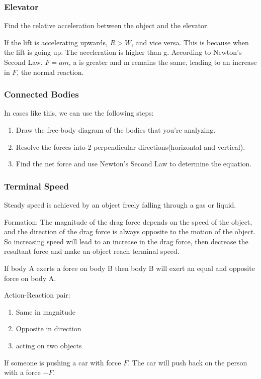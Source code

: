 \documentclass[11pt, a4paper,oneside]{book}
\begin{document}
\subsubsection{Elevator}
Find the relative acceleration between the object and the elevator. \par
If the lift is accelerating upwards, $R > W$, and vice versa. This is because when the lift is going up. The acceleration is higher than g. According to Newton's Second Law, $F = am$, a is greater and m remains the same, leading to an increase in $F$, the normal reaction.
\subsubsection{Connected Bodies}

In cases like this, we can use the following steps:
\begin{enumerate}
    \setlength{\itemsep}{-1ex}
    \setlength{\parsep}{-1ex}
    \item Draw the free-body diagram of the bodies that you're analyzing.
    \item Resolve the forces into 2 perpendicular directions(horizontal and vertical).
    \item Find the net force and use Newton's Second Law to determine the equation.
    \setlength{\topsep}{-1em}
\end{enumerate}
\subsubsection{Terminal Speed}
\begin{definition}
Steady speed is achieved by an object freely falling through a gas or liquid.
\end{definition}

Formation: The magnitude of the drag force depends on the speed of the object, and the direction of the drag force is always opposite to the motion of the object. So increasing speed will lead to an increase in the drag force, then decrease the resultant force and make an object reach terminal speed.
\begin{theorem}
    If body A exerts a force on body B then body B will exert an equal and opposite force on body A.
\end{theorem}

Action-Reaction pair:
\begin{enumerate}
    \setlength{\itemsep}{-1ex}
    \setlength{\parsep}{-1ex}
    \item Same in magnitude
    \item Opposite in direction
    \item acting on two objects
    \setlength{\topsep}{-1em}
\end{enumerate}
\begin{example}
If someone is pushing a car with force $F$. The car will push back on the person with a force $-F$.
\end{example}
\end{document}
